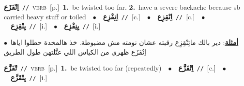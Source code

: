 \documentclass[10pt,a4paper,twoside]{article} %
\begin{document}
\begin{multicols}{2}
{\setlength\topsep{0pt}\textbf{\foreignlanguage{arabic}{اِنْقَزَع}}\ {\color{gray}\texttt{//}\color{black}}\ \textsc{verb}\ [p.]\ \textbf{1.}~be twisted too far.  \textbf{2.}~have a severe backache because sb carried heavy stuff or toiled\ \ $\bullet$\ \ \setlength\topsep{0pt}\textbf{\foreignlanguage{arabic}{اِنِقْزِع}}\ {\color{gray}\texttt{//}\color{black}}\ [c.]\ \ $\bullet$\ \ \setlength\topsep{0pt}\textbf{\foreignlanguage{arabic}{اِنْقِزِع}}\ {\color{gray}\texttt{//}\color{black}}\ [c.]\ \ $\bullet$\ \ \setlength\topsep{0pt}\textbf{\foreignlanguage{arabic}{يِنْقِزِع}}\ {\color{gray}\texttt{//}\color{black}}\ [i.]\ \ $\bullet$\ \ \setlength\topsep{0pt}\textbf{\foreignlanguage{arabic}{يِنِقْزِع}}\ {\color{gray}\texttt{//}\color{black}}\ [i.]\  \begin{flushright}\color{gray}\foreignlanguage{arabic}{\textbf{\underline{\foreignlanguage{arabic}{أمثلة}}}: دير بالك ماتِنْقِزِع رقبته عشان نومته مش مضبوطة. خذ هالمخدة حطلوا اياها\ $\bullet$\ \  اِنْقَزَع ظهري من الكياس اللي عتَّلتهن طول الطريق}\end{flushright}\color{black}} \vspace{2mm}

{\setlength\topsep{0pt}\textbf{\foreignlanguage{arabic}{تْقَزَّع}}\ {\color{gray}\texttt{//}\color{black}}\ \textsc{verb}\ [p.]\ \textbf{1.}~be twisted too far (repeatedly)\ \ $\bullet$\ \ \setlength\topsep{0pt}\textbf{\foreignlanguage{arabic}{اِتْقَزَّع}}\ {\color{gray}\texttt{//}\color{black}}\ [c.]\ \ $\bullet$\ \ \setlength\topsep{0pt}\textbf{\foreignlanguage{arabic}{يِتْقَزَّع}}\ {\color{gray}\texttt{//}\color{black}}\ [i.]\ } \vspace{2mm}


\end{multicols}
\end{document}

